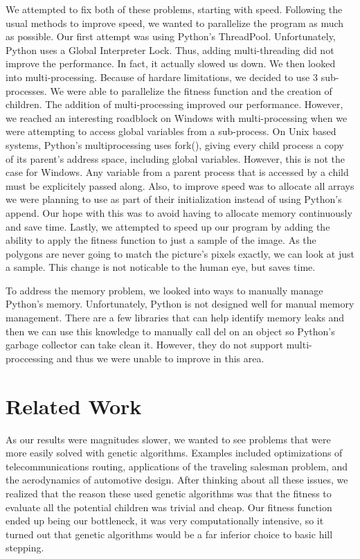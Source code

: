 \documentclass[12pt,letterpaper]{article}
\begin{document}
We attempted to fix both of these problems, starting with speed.  Following the usual methods to improve speed, we wanted to parallelize the program as much as possible. Our first attempt was using Python's ThreadPool. Unfortunately, Python uses a Global Interpreter Lock.  Thus, adding multi-threading did not improve the performance.  In fact, it actually slowed us down.  We then looked into multi-processing. Because of hardare limitations, we decided to use 3 sub-processes.  We were able to parallelize the fitness function and the creation of children. The addition of multi-processing improved our performance. However, we reached an interesting roadblock on Windows with multi-processing when we were attempting to access global variables from a sub-process.  On Unix based systems, Python's multiprocessing uses fork(), giving every child process a copy of its parent's address space, including global variables.  However, this is not the case for Windows.  Any variable from a parent process that is accessed by a child must be explicitely passed along.  Also, to improve speed was to allocate all arrays we were planning to use as part of their initialization instead of using Python's append.  Our hope with this was to avoid having to allocate memory continuously and save time.  Lastly, we attempted to speed up our program by adding the ability to apply the fitness function to just a sample of the image.  As the polygons are never going to match the picture's pixels exactly, we can look at just a sample.  This change is not noticable to the human eye, but saves time.

To address the memory problem, we looked into ways to manually manage Python's memory.  Unfortunately, Python is not designed well for manual memory management.  There are a few libraries that can help identify memory leaks and then we can use this knowledge to manually call del on an object so Python's garbage collector can take clean it.  However, they do not support multi-proccessing and thus we were unable to improve in this area.

\section{Related Work}
As our results were magnitudes slower, we wanted to see problems that were more easily solved with genetic algorithms. Examples included optimizations of telecommunications routing, applications of the traveling salesman problem, and the aerodynamics of automotive design. After thinking about all these issues, we realized that the reason these used genetic algorithms was that the fitness to evaluate all the potential children was trivial and cheap. Our fitness function ended up being our bottleneck, it was very computationally intensive, so it turned out that genetic algorithms would be a far inferior choice to basic hill stepping.
\end{document}
